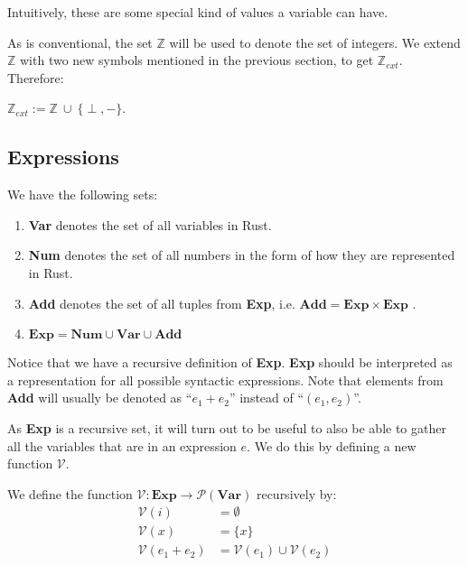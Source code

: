Intuitively, these are some special kind of values a variable can have. 

As is conventional, the set $\mathbb{Z}$ will be used to denote the set of integers. We extend $\mathbb{Z}$ with two new symbols mentioned in the previous section, to get $\mathbb{Z}_{ext}$. Therefore: 

\begin{definition}
$\mathbb{Z}_{ext} := \mathbb{Z} ~\cup ~ \{\perp, -\}$.
\end{definition}

\subsection*{Expressions}
\begin{definition}
We have the following sets:
\begin{enumerate}[noitemsep, label={\roman*)}]
    \item \textbf{Var} denotes the set of all variables in Rust.
    \item \textbf{Num} denotes the set of all numbers in the form of how they are represented in Rust.
    \item \textbf{Add} denotes the set of all tuples from \textbf{Exp}, i.e. $\textbf{Add} = \textbf{Exp} \times \textbf{Exp}$ . 
    \item $\textbf{Exp} = \textbf{Num} \cup \textbf{Var} \cup \textbf{Add}$
\end{enumerate}
\end{definition}

Notice that we have a recursive definition of \textbf{Exp}. \textbf{Exp} should be interpreted as a representation for all possible syntactic expressions. Note that elements from \textbf{Add} will usually be denoted as ``$e_1 + e_2$'' instead of ``$(e_1, e_2)$''.

As \textbf{Exp} is a recursive set, it will turn out to be useful to also be able to gather all the variables that are in an expression $e$. We do this by defining a new function $\mathcal{V}$.

\begin{definition}
We define the function $\mathcal{V}: \textbf{Exp} \to \mathcal{P}(\textbf{Var})$ recursively by:
\begin{align*}
    \mathcal{V}(i)          &= \emptyset
\\  \mathcal{V}(x)          &= \{ x \}
\\  \mathcal{V}(e_1 + e_2)  &= \mathcal{V}(e_1) \cup \mathcal{V}(e_2)
\end{align*}
\end{definition}

